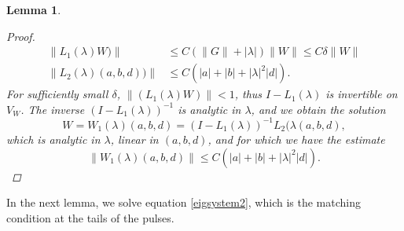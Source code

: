 \documentclass[12pt]{elsarticle}
\newtheorem{lemma}{Lemma}
\begin{document}
\begin{lemma}
\begin{proof}
\begin{align*}
\|L_1(\lambda)W)\| &\leq C \left(\|G\| + |\lambda| \right)\|W\| \leq C \delta \|W\| \\
\|L_2(\lambda)(a,b,d))\| &\leq C\left( |a| + |b| + |\lambda|^2 |d| \right).
\end{align*}
For sufficiently small $\delta$, $\|(L_1(\lambda)W)\| < 1$, thus $I - L_1(\lambda)$ is invertible on $V_W$. The inverse $(I - L_1(\lambda))^{-1}$ is analytic in $\lambda$, and we obtain the solution 
\[
W = W_1(\lambda)(a,b,d) = (I - L_1(\lambda))^{-1} L_2(\lambda(a,b,d),
\]
which is analytic in $\lambda$, linear in $(a, b, d)$, and for which we have the estimate
\begin{equation*}
\|W_1(\lambda)(a,b,d)\| \leq C \left( |a| + |b| + |\lambda|^2 |d| \right).
\end{equation*}
\end{proof}
\end{lemma}

In the next lemma, we solve equation \cref{eigsystem2}, which is the matching condition at the tails of the pulses.
\end{document}

